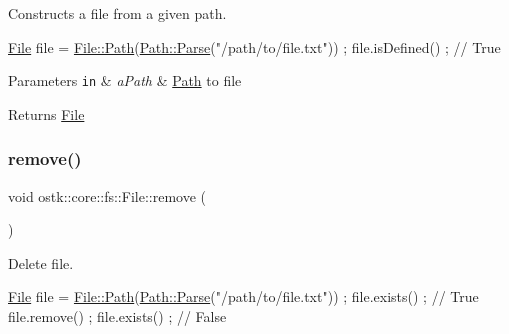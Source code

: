Constructs a file from a given path. 


\begin{DoxyCode}
\hyperlink{classostk_1_1core_1_1fs_1_1_file_ad1695224996950be9962b8457da369b3}{File} file = \hyperlink{classostk_1_1core_1_1fs_1_1_file_ad677c6a3edc1e88c18226edebff1da03}{File::Path}(\hyperlink{classostk_1_1core_1_1fs_1_1_path_ad08539ba654f5df11c4bcb07276345ad}{Path::Parse}(\textcolor{stringliteral}{"/path/to/file.txt"})) ;
file.isDefined() ; \textcolor{comment}{// True}
\end{DoxyCode}



\begin{DoxyParams}[1]{Parameters}
\mbox{\tt in}  & {\em a\+Path} & \hyperlink{classostk_1_1core_1_1fs_1_1_path}{Path} to file \\
\hline
\end{DoxyParams}
\begin{DoxyReturn}{Returns}
\hyperlink{classostk_1_1core_1_1fs_1_1_file}{File} 
\end{DoxyReturn}
\mbox{\label{classostk_1_1core_1_1fs_1_1_file_a08ab15296e2baa61e7a023514cb46f31}} 
\subsubsection{\texorpdfstring{remove()}{remove()}}
{\footnotesize\ttfamily void ostk\+::core\+::fs\+::\+File\+::remove (\begin{DoxyParamCaption}{ }\end{DoxyParamCaption})}



Delete file. 


\begin{DoxyCode}
\hyperlink{classostk_1_1core_1_1fs_1_1_file_ad1695224996950be9962b8457da369b3}{File} file = \hyperlink{classostk_1_1core_1_1fs_1_1_file_ad677c6a3edc1e88c18226edebff1da03}{File::Path}(\hyperlink{classostk_1_1core_1_1fs_1_1_path_ad08539ba654f5df11c4bcb07276345ad}{Path::Parse}(\textcolor{stringliteral}{"/path/to/file.txt"})) ;
file.exists() ; \textcolor{comment}{// True}
file.remove() ;
file.exists() ; \textcolor{comment}{// False}
\end{DoxyCode}
 \mbox{\label{classostk_1_1core_1_1fs_1_1_file_ab1afed5cc78b78359201b587a4b63307}} 
